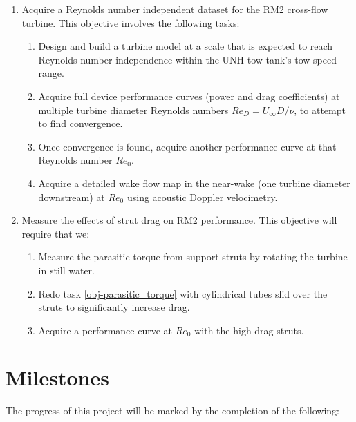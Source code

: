 \documentclass[12pt,letterpaper]{scrreprt}
\begin{document}
\begin{enumerate}

	\item Acquire a Reynolds number independent dataset for the RM2 cross-flow
	turbine. This objective involves the following tasks:

		\begin{enumerate}
			\item Design and build a turbine model at a scale that is expected to reach
			Reynolds number independence within the UNH tow tank's tow speed range.
		
			\item Acquire full device performance curves (power and drag coefficients) at
			multiple turbine diameter Reynolds numbers $Re_D = U_\infty D/ \nu$, to
			attempt to find convergence.
		  
			\item Once convergence is found, acquire another performance curve at that
			Reynolds number $Re_0$.
		
			\item Acquire a detailed wake flow map in the near-wake (one turbine diameter
			downstream) at $Re_0$ using acoustic Doppler velocimetry.
		\end{enumerate}
	
	\item Measure the effects of strut drag on RM2 performance. This objective will
	require that we:
	
	\begin{enumerate}
		\item Measure the parasitic torque from support struts by rotating the turbine
		in still water. \label{obj-parasitic_torque}
		
		\item Redo task \ref{obj-parasitic_torque} with cylindrical tubes slid over
		the struts to significantly increase drag.
		
		\item Acquire a performance curve at $Re_0$ with the high-drag struts. 
	\end{enumerate}
	
\end{enumerate}

\section{Milestones}
The progress of this project will be marked by the completion of the following:
\end{document}
